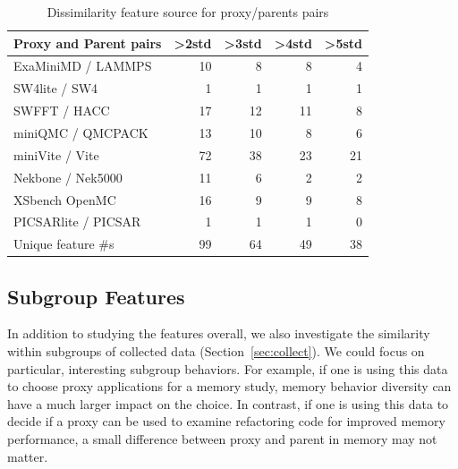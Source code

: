 \begin{table}[t]
\caption{Dissimilarity feature source for proxy/parents pairs}
\label{tab:Dissimilarity}
\centering
\begin{tabular}{lrrrr}%
\toprule
\textbf{Proxy and Parent pairs}               & \textbf{\textgreater{}2std} & \textbf{\textgreater{}3std} & \textbf{\textgreater{}4std} & \textbf{\textgreater{}5std} \\ \midrule
ExaMiniMD / LAMMPS                            & 10                          & 8                           & 8                           & 4                           \\ 
SW4lite / SW4                                 & 1                           & 1                           & 1                           & 1                           \\ 
SWFFT / HACC                                  & 17                          & 12                          & 11                          & 8                           \\ 
miniQMC / QMCPACK                             & 13                          & 10                          & 8                           & 6                           \\ 
miniVite / Vite                               & 72                          & 38                          & 23                          & 21                          \\ 
Nekbone / Nek5000                             & 11                          & 6                           & 2                           & 2                           \\ 
XSbench OpenMC                                & 16                          & 9                           & 9                           & 8                           \\ 
PICSARlite / PICSAR                           & 1                           & 1                           & 1                           & 0                           \\ 
Unique feature \#s & 99                          & 64                          & 49                          & 38                          \\ \bottomrule
\end{tabular}

\end{table}


\subsection{Subgroup Features}
\label{sec:subgroup}
In addition to studying the features overall, we also investigate the similarity within subgroups of collected data (Section~\ref{sec:collect}). We could focus on particular, interesting subgroup behaviors. 
For example, if one is using this data to choose proxy applications for a memory study, memory behavior diversity can have a much larger impact on the choice. In contrast, if one is using this data to decide if a proxy can be used to examine refactoring code for improved memory performance, a small difference between proxy and parent in memory may not matter. 

